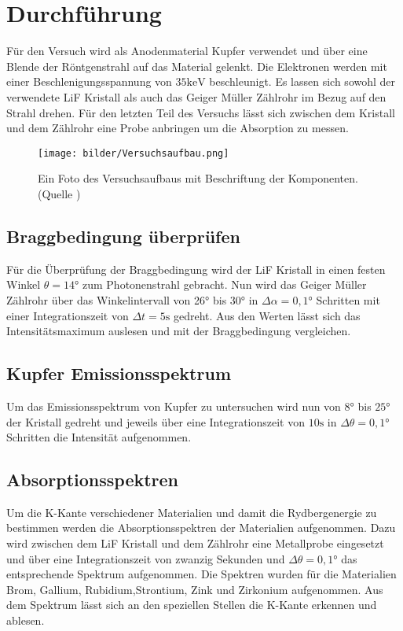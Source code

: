 \section{Durchführung}
\label{sec:Durchfuehrung}
Für den Versuch wird als Anodenmaterial Kupfer verwendet und über eine Blende der Röntgenstrahl auf das Material gelenkt.
Die Elektronen werden mit einer Beschlenigungsspannung von  $35 \text{keV}$ beschleunigt.
Es lassen sich sowohl der verwendete LiF Kristall als auch das Geiger Müller Zählrohr im Bezug auf den Strahl drehen.
Für den letzten Teil des Versuchs lässt sich zwischen dem Kristall und dem Zählrohr eine Probe anbringen um die Absorption zu messen.
\begin{figure}
    \centering
    \texttt{[image: bilder/Versuchsaufbau.png]}
    \caption{Ein Foto des Versuchsaufbaus mit Beschriftung der Komponenten. (Quelle \cite{Anleitung})}
    \label{fig:Versuchsaufbau}
\end{figure}

\subsection{Braggbedingung überprüfen}
Für die Überprüfung der Braggbedingung wird der LiF Kristall in einen festen Winkel $\theta = 14°$ zum Photonenstrahl gebracht.
Nun wird das Geiger Müller Zählrohr über das Winkelintervall von 26° bis 30° in $\Delta \alpha = 0,1°$ Schritten mit einer Integrationszeit von $\Delta t = 5 \text{s}$ gedreht.
Aus den Werten lässt sich das Intensitätsmaximum auslesen und mit der Braggbedingung vergleichen.
\subsection{Kupfer Emissionsspektrum}
Um das Emissionsspektrum von Kupfer zu untersuchen wird nun von $8°$ bis $25°$ der Kristall gedreht und jeweils über eine Integrationszeit von $10 \text{s}$ in $\Delta \theta = 0,1°$ Schritten die Intensität aufgenommen.
\subsection{Absorptionsspektren}
Um die K-Kante verschiedener Materialien und damit die Rydbergenergie zu bestimmen werden die Absorptionsspektren der Materialien aufgenommen.
Dazu wird zwischen dem LiF Kristall und dem Zählrohr eine Metallprobe eingesetzt und über eine Integrationszeit von zwanzig Sekunden und $\Delta \theta = 0,1°$ das entsprechende Spektrum aufgenommen.
Die Spektren wurden für die Materialien Brom, Gallium, Rubidium,Strontium, Zink und Zirkonium aufgenommen.
Aus dem Spektrum lässt sich an den speziellen Stellen die K-Kante erkennen und ablesen.